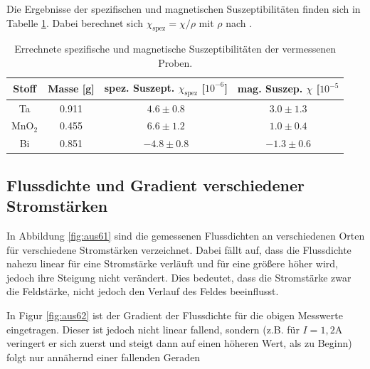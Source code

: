 \documentclass[12pt,a4paper,titlepage,headinclude,bibtotoc]{scrartcl}
\begin{document}
Die Ergebnisse der spezifischen und magnetischen Suszeptibilitäten finden sich in Tabelle \ref{tab:suszep}.
Dabei berechnet sich $\chi_\text{spez}=\chi/\rho$ mit $\rho$ nach \cite{formelsammlung}.

\begin{table}
	\centering
	\begin{tabular}{|c|c|c|c|}
		\hline
		Stoff 	& Masse [g]	& spez. Suszept. $\chi_\text{spez}$ [$10^{-6}$]	& mag. Suszep. $\chi$ [$10^{-5}$ \\\hline\hline
		Ta	& 0.911		& $4.6\pm 0.8$ 			& $3.0 \pm 1.3$ \\\hline
		MnO$_2$	& 0.455		& $6.6 \pm 1.2$			& $1.0 \pm 0.4$ \\\hline
		Bi	& 0.851		& $-4.8 \pm 0.8 $		& $-1.3 \pm 0.6$\\\hline
	\end{tabular}
	\caption{Errechnete spezifische und magnetische Suszeptibilitäten der vermessenen Proben.}
	\label{tab:suszep}
\end{table}

\subsection{Flussdichte und Gradient verschiedener Stromstärken}
In Abbildung \ref{fig:aus61} sind die gemessenen Flussdichten an verschiedenen Orten für verschiedene Stromstärken verzeichnet.
Dabei fällt auf, dass die Flussdichte nahezu linear für eine Stromstärke verläuft und für eine größere höher wird, jedoch ihre Steigung nicht verändert.
Dies bedeutet, dass die Stromstärke zwar die Feldstärke, nicht jedoch den Verlauf des Feldes beeinflusst.

In Figur \ref{fig:aus62} ist der Gradient der Flussdichte für die obigen Messwerte eingetragen.
Dieser ist jedoch nicht linear fallend, sondern (z.B. für $I=1,2\si\ampere$ veringert er sich zuerst und steigt dann auf einen höheren Wert, als zu Beginn) folgt nur annähernd einer fallenden Geraden
\end{document}

